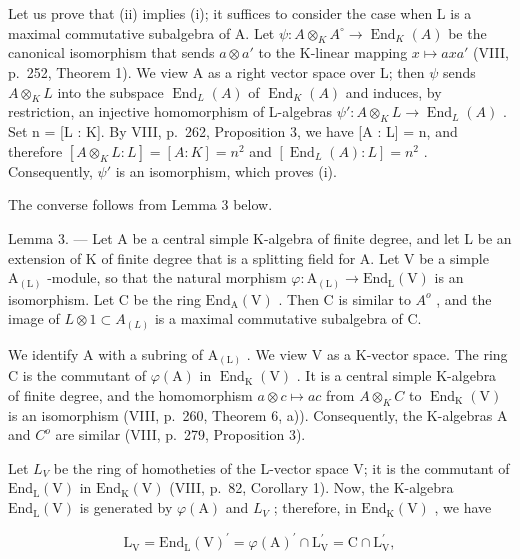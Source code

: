 Let us prove that (ii) implies (i); it suffices to consider the case when L is a maximal commutative subalgebra of A. Let \(\psi: A \otimes_{K} A^{\circ} \to \operatorname{End}_{K}(A)\) be the canonical isomorphism that sends \(a \otimes a'\) to the K-linear mapping \(x \mapsto axa'\) (VIII, p.~252, Theorem 1). We view A as a right vector space over L; then \(\psi\) sends \(A \otimes_{K} L\) into the subspace \(\operatorname{End}_{L}(A)\) of \(\operatorname{End}_{K}(A)\) and induces, by restriction, an injective homomorphism of L-algebras \(\psi': A \otimes_{K} L \to \operatorname{End}_{L}(A)\) . Set n = {[}L : K{]}. By VIII, p.~262, Proposition 3, we have {[}A : L{]} = n, and therefore \([A \otimes_{K} L : L] = [A : K] = n^{2}\) and \([\operatorname{End}_{L}(A) : L] = n^{2}\) . Consequently, \(\psi'\) is an isomorphism, which proves (i).

The converse follows from Lemma 3 below.

Lemma 3. --- Let A be a central simple K-algebra of finite degree, and let L be an extension of K of finite degree that is a splitting field for A. Let V be a simple \(\mathrm{A}_{(\mathrm{L})}\) -module, so that the natural morphism \(\varphi: \mathrm{A}_{(\mathrm{L})} \to \mathrm{End}_{\mathrm{L}}(\mathrm{V})\) is an isomorphism. Let C be the ring \(\mathrm{End}_{\mathrm{A}}(\mathrm{V})\) . Then C is similar to \(A^{o}\) , and the image of \(L \otimes 1 \subset A_{(L)}\) is a maximal commutative subalgebra of C.

We identify A with a subring of \(\mathrm{A}_{(\mathrm{L})}\) . We view V as a K-vector space. The ring C is the commutant of \(\varphi(\mathrm{A})\) in \(\operatorname{End}_{\mathrm{K}}(\mathrm{V})\) . It is a central simple K-algebra of finite degree, and the homomorphism \(a \otimes c \mapsto ac\) from \(A \otimes_{K} C\) to \(\operatorname{End}_{\mathrm{K}}(\mathrm{V})\) is an isomorphism (VIII, p.~260, Theorem 6, a)). Consequently, the K-algebras A and \(C^{o}\) are similar (VIII, p.~279, Proposition 3).

Let \(L_{V}\) be the ring of homotheties of the L-vector space V; it is the commutant of \(\mathrm{End}_{\mathrm{L}}(\mathrm{V})\) in \(\mathrm{End}_{\mathrm{K}}(\mathrm{V})\) (VIII, p.~82, Corollary 1). Now, the K-algebra \(\mathrm{End}_{\mathrm{L}}(\mathrm{V})\) is generated by \(\varphi(\mathrm{A})\) and \(L_{V}\) ; therefore, in \(\mathrm{End}_{\mathrm{K}}(\mathrm{V})\) , we have

\[
\mathrm{L} _ {\mathrm{V}} = \mathrm{End} _ {\mathrm{L}} (\mathrm{V}) ^ {\prime} = \varphi (\mathrm{A}) ^ {\prime} \cap \mathrm{L} _ {\mathrm{V}} ^ {\prime} = \mathrm{C} \cap \mathrm{L} _ {\mathrm{V}} ^ {\prime},
\]

